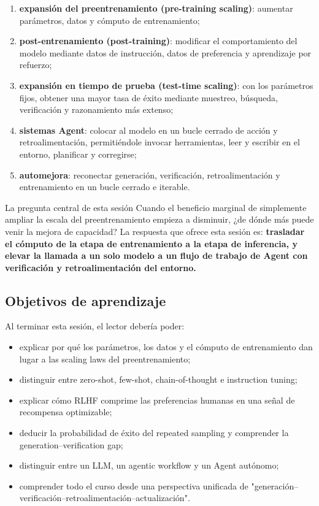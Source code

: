 \documentclass[a4paper]{article}
\begin{document}
\begin{enumerate}
    \item \textbf{expansión del preentrenamiento (pre-training scaling)}: aumentar parámetros, datos y cómputo de entrenamiento;
    \item \textbf{post-entrenamiento (post-training)}: modificar el comportamiento del modelo mediante datos de instrucción, datos de preferencia y aprendizaje por refuerzo;
    \item \textbf{expansión en tiempo de prueba (test-time scaling)}: con los parámetros fijos, obtener una mayor tasa de éxito mediante muestreo, búsqueda, verificación y razonamiento más extenso;
    \item \textbf{sistemas Agent}: colocar al modelo en un bucle cerrado de acción y retroalimentación, permitiéndole invocar herramientas, leer y escribir en el entorno, planificar y corregirse;
    \item \textbf{automejora}: reconectar generación, verificación, retroalimentación y entrenamiento en un bucle cerrado e iterable.
\end{enumerate}

\begin{importantbox}{La pregunta central de esta sesión}
Cuando el beneficio marginal de simplemente ampliar la escala del preentrenamiento empieza a disminuir, ¿de dónde más puede venir la mejora de capacidad? La respuesta que ofrece esta sesión es: \textbf{trasladar el cómputo de la etapa de entrenamiento a la etapa de inferencia, y elevar la llamada a un solo modelo a un flujo de trabajo de Agent con verificación y retroalimentación del entorno.}
\end{importantbox}

\subsection{Objetivos de aprendizaje}

Al terminar esta sesión, el lector debería poder:

\begin{itemize}
    \item explicar por qué los parámetros, los datos y el cómputo de entrenamiento dan lugar a las scaling laws del preentrenamiento;
    \item distinguir entre zero-shot, few-shot, chain-of-thought e instruction tuning;
    \item explicar cómo RLHF comprime las preferencias humanas en una señal de recompensa optimizable;
    \item deducir la probabilidad de éxito del repeated sampling y comprender la generation--verification gap;
    \item distinguir entre un LLM, un agentic workflow y un Agent autónomo;
    \item comprender todo el curso desde una perspectiva unificada de "generación--verificación--retroalimentación--actualización".
\end{itemize}
\end{document}
